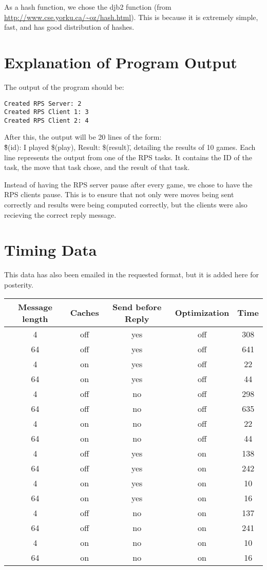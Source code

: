 \documentclass{article}
\begin{document}
    As a hash function, we chose the djb2 function (from \url{http://www.cse.yorku.ca/\~oz/hash.html}). This is because it is extremely simple, fast, and has good distribution of hashes.
\section{Explanation of Program Output}
The output of the program should be:
\begin{verbatim}
Created RPS Server: 2
Created RPS Client 1: 3
Created RPS Client 2: 4
\end{verbatim}
After this, the output will be 20 lines of the form: \\\"\$(id): I played \$(play), Result: \$(result)\", detailing the results of 10 games.
Each line represents the output from one of the RPS tasks. It contains the ID of the task, the move that task chose, and the result of that task.

Instead of having the RPS server pause after every game, we chose to have the RPS clients pause.
This is to ensure that not only were moves being sent correctly and results were being computed correctly, but the clients were also recieving the correct reply message.
\section{Timing Data}
This data has also been emailed in the requested format, but it is added here for posterity.\\
\begin{tabular}{|c|c|c|c|c|}
\hline
Message length & Caches & Send before Reply & Optimization & Time\\
\hline
4   &    off  &   yes   &      off       &      308\\
64  &    off  &   yes   &      off       &      641\\
4   &    on   &   yes   &      off       &      22\\
64  &    on   &   yes   &      off       &      44\\
4   &    off  &   no    &      off       &      298\\
64  &    off  &   no    &      off       &      635\\
4   &    on   &   no    &      off       &      22\\
64  &    on   &   no    &      off       &      44\\
4   &    off  &   yes   &      on        &      138\\
64  &    off  &   yes   &      on        &      242\\
4   &    on   &   yes   &      on        &      10\\
64  &    on   &   yes   &      on        &      16\\
4   &    off  &   no    &      on        &      137\\
64  &    off  &   no    &      on        &      241\\
4   &    on   &   no    &      on        &      10\\
64  &    on   &   no    &      on        &      16\\
\hline
\end{tabular}
\end{document}
